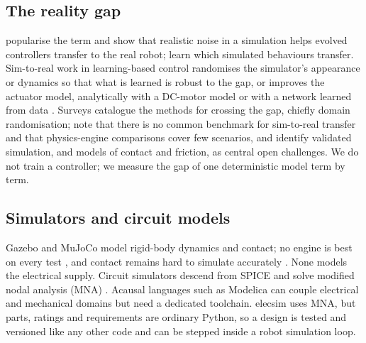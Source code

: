 \documentclass[conference,a4paper]{IEEEtran}
\begin{document}
\subsection{The reality gap}
\citet{jakobi1995noise} popularise the term and show that realistic noise in
a simulation helps evolved controllers transfer to the real robot;
\citet{koos2013transferability} learn which simulated behaviours transfer.
Sim-to-real work in learning-based control randomises the simulator's
appearance \citep{tobin2017domain} or dynamics
\citep{peng2018sim,muratore2022robot} so that what is learned is robust to the
gap, or improves the actuator model, analytically with a DC-motor model
\citep{tan2018sim} or with a network learned from data
\citep{hwangbo2019learning}. Surveys \citep{zhao2020sim,muratore2022robot}
catalogue the methods for crossing the gap, chiefly domain randomisation;
\citet{muratore2022robot} note that there is no common benchmark for
sim-to-real transfer and that physics-engine comparisons cover few scenarios,
and \citet{choi2021use} identify validated simulation, and models of contact
and friction, as central open challenges. We do not train a controller; we measure the gap of
one deterministic model term by term.

\subsection{Simulators and circuit models}
Gazebo \citep{koenig2004design} and MuJoCo \citep{todorov2012mujoco} model
rigid-body dynamics and contact; no engine is best on every test
\citep{erez2015simulation}, and contact remains hard to simulate accurately
\citep{erez2015simulation,collins2021review}. None models the electrical supply. Circuit simulators
descend from SPICE \citep{nagel1973spice} and solve modified nodal analysis
(MNA) \citep{ho1975modified}. Acausal languages such as Modelica
\citep{fritzson2014principles} can couple electrical and mechanical domains
but need a dedicated toolchain. elecsim uses MNA, but parts, ratings and
requirements are ordinary Python, so a design is tested and versioned like
any other code and can be stepped inside a robot simulation loop.
\end{document}
